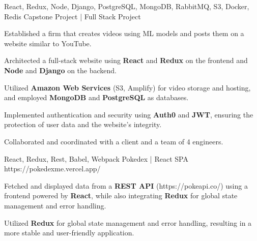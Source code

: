


\begin{cventries}



\cventry
{React, Redux, Node, Django, PostgreSQL, MongoDB, RabbitMQ, S3, Docker, Redis } %
{Capstone Project | Full Stack Project }  %
{} %
{}
{
	\begin{cvitems} %
		\item {Established a firm that creates videos using ML models and posts them on a website similar to YouTube.}
    \item {Architected a full-stack website using \textbf{React} and \textbf{Redux} on the frontend and \textbf{Node} and \textbf{Django} on the backend.}
    \item {Utilized \textbf{Amazon Web Services} (S3, Amplify) for video storage and hosting, and employed \textbf{MongoDB} and \textbf{PostgreSQL} as databases.}
    \item { Implemented authentication and security using \textbf{Auth0} and \textbf{JWT}, ensuring the protection of user data and the website's integrity.}
		\item {Collaborated and coordinated with a client and a team of 4 engineers.}
	\end{cvitems}
}

\cventry
{React, Redux, Rest, Babel, Webpack } %
{Pokedex | React SPA }  %
{https://pokedexme.vercel.app/ } %
{}
{
	\begin{cvitems} %
		\item {Fetched and displayed data from a \textbf{REST API} (https://pokeapi.co/) using a frontend powered by \textbf{React}, while also integrating \textbf{Redux} for global state management and error handling.}
    \item {Utilized \textbf{Redux} for global state management and error handling, resulting in a more stable and user-friendly application.}
	\end{cvitems}
}


\end{cventries}
